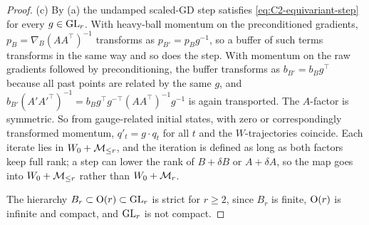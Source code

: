 \begin{proof}
(c) By (a) the undamped scaled-GD step satisfies \eqref{eq:C2-equivariant-step} for every
$g\in\mathrm{GL}_r$. With heavy-ball momentum on the preconditioned gradients, $p_B=\nabla_B(AA^\top)^{-1}$ transforms as
$p_{B'}=p_Bg^{-1}$, so a buffer of such terms transforms in the same way and so does the step. With momentum on the raw
gradients followed by preconditioning, the buffer transforms as $b_{B'}=b_Bg^\top$ because all past points are related by
the same $g$, and $b_{B'}(A'A'^\top)^{-1}=b_Bg^\top g^{-\top}(AA^\top)^{-1}g^{-1}$ is again transported. The $A$-factor is
symmetric. So from gauge-related initial states, with zero or correspondingly transformed momentum, $q'_t=g\cdot q_t$ for
all $t$ and the $W$-trajectories coincide. Each iterate lies in $W_0+\mathcal{M}_{\le r}$, and the iteration is defined as long as both
factors keep full rank; a step can lower the rank of $B+\delta B$ or $A+\delta A$, so the map goes into $W_0+\mathcal{M}_{\le r}$ rather
than $W_0+\mathcal{M}_r$.

The hierarchy $B_r\subset\mathrm{O}(r)\subset\mathrm{GL}_r$ is strict for $r\ge2$, since $B_r$ is finite, $\mathrm{O}(r)$ is infinite and
compact, and $\mathrm{GL}_r$ is not compact.
\end{proof}


